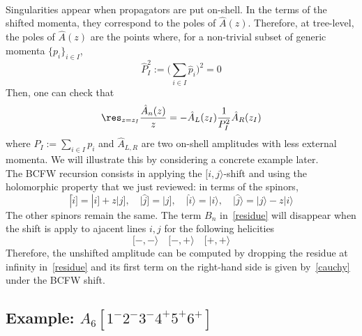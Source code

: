 \\
Singularities appear when propagators are put on-shell. 
In the terms of the shifted momenta, they correspond to the poles of $\hat{A}(z)$.
Therefore, at tree-level, the poles of $\hat{A}(z)$ are the points where, for a non-trivial subset of generic momenta $\{p_i\}_{i\in I}$, 
\begin{equation*}
\hat{P}_I^2 := \big( \sum_{i\in I} \hat{p}_i \big)^2 = 0
\end{equation*}   
%
Then, one can check that
\begin{equation}\label{cauchy}
\res_{z=z_I}\frac{\hat{A}_n(z)}{z} = - \hat{A}_L(z_I)\frac{1}{P_I^2}\hat{A}_R(z_I)
\end{equation}
where $P_I := \sum_{i\in I}p_i$ and $\hat{A}_{L,R}$ are two on-shell amplitudes with less external momenta.
We will illustrate this by considering a concrete example later.
%
%
\\
The BCFW recursion consists in applying the $[i,j\rangle$-shift and using the holomorphic property that we just reviewed:
in terms of the spinors,
\begin{equation}
|\hat{i}] = |i] + z |j], \quad |\hat{j}] = |j], \quad|\hat{i}\rangle = |i\rangle, \quad |\hat{j}\rangle = |j\rangle - z|i\rangle
\end{equation}  
The other spinors remain the same. 
The term $B_n$ in~\cref{residue} will disappear when the shift is apply to ajacent lines $i,j$ for the following helicities~\cite{ArkaniHamed:2008yf}
\begin{equation*}
[-,-\rangle \quad [-,+\rangle \quad [+,+\rangle
\end{equation*}
Therefore, the unshifted amplitude can be computed by dropping the residue at infinity in~\cref{residue} and its first term on the right-hand side is given by~\cref{cauchy} under the BCFW shift.
%
\subsection{Example: $A_6[1^-2^-3^-4^+5^+6^+]$}





